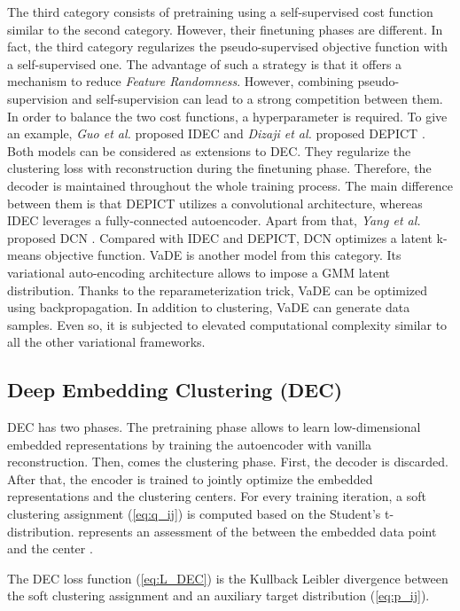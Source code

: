 \documentclass{article}
\begin{document}
The third category consists of pretraining using a self-supervised cost function similar to the second category. However, their finetuning phases are different. In fact, the third category regularizes the pseudo-supervised objective function with a self-supervised one. The advantage of such a strategy is that it offers a mechanism to reduce \textit{Feature Randomness}. However, combining pseudo-supervision and self-supervision can lead to a strong competition between them. In order to balance the two cost functions, a hyperparameter is required. To give an example, \textit{Guo et al.} proposed IDEC \cite{paper28} and  \textit{Dizaji et al.} proposed DEPICT \cite{paper36}. Both models can be considered as extensions to DEC. They regularize the clustering loss with reconstruction during the finetuning phase. Therefore, the decoder is maintained throughout the whole training process. The main difference between them is that DEPICT utilizes a convolutional architecture, whereas IDEC leverages a fully-connected autoencoder. Apart from that, \textit{Yang et al.} proposed DCN \cite{paper29}. Compared with IDEC and DEPICT, DCN optimizes a latent k-means objective function. VaDE \cite{paper35} is another model from this category. Its variational auto-encoding architecture allows to impose a GMM latent distribution. Thanks to the reparameterization trick, VaDE can be optimized using backpropagation. In addition to clustering, VaDE can generate data samples. Even so, it is subjected to elevated computational complexity similar to all the other variational frameworks.





\subsection{Deep Embedding Clustering (DEC)}
DEC \cite{paper27} has two phases. The pretraining phase allows to learn low-dimensional embedded representations by training the autoencoder with vanilla reconstruction. Then, comes the clustering phase. First, the decoder is discarded. After that, the encoder is trained to jointly optimize the embedded representations and the clustering centers. For every training iteration, a soft clustering assignment  (\ref{eq:q_ij}) is computed based on the Student’s t-distribution.  represents an assessment of the  between the embedded data point  and the center .



The DEC loss function (\ref{eq:L_DEC}) is the Kullback Leibler divergence between the soft clustering assignment  and an auxiliary target distribution  (\ref{eq:p_ij}).
\end{document}

